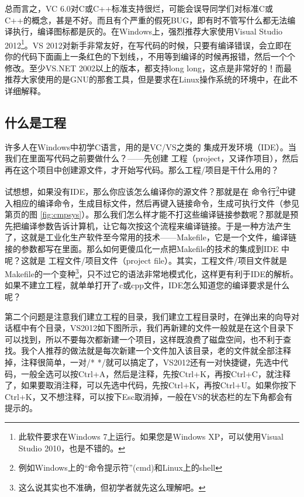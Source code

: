 \documentclass[11pt,twoside,a4paper,titlepage]{article}	%
\newcommand{\kw}[1]{\textcolor[rgb]{0.0,0.0,0.63}{ #1}}
\begin{document}
总而言之，VC 6.0对C或C++标准支持很烂，可能会误导同学们对标准C或C++的概念，甚是不好。而且有个严重的假死BUG，即有时不管写什么都无法编译执行，编译图标都是灰的。在Windows上，强烈推荐大家使用Visual Studio 2012\footnote{此软件要求在Windows 7上运行。如果您是Windows XP，可以使用Visual Studio 2010，也是不错的。}。VS 2012对新手非常友好，在写代码的时候，只要有编译错误，会立即在你的代码下面画上一条红色的下划线，{\color{red}{\uwave{\color{black}{就}}}}{\color{red}{\uwave{\color{black}{像}}}}{\color{red}{\uwave{\color{black}{这}}}}{\color{red}{\uwave{\color{black}{样}}}}，不用等到编译的时候再报错，然后一个个修改。至少VS.NET 2002以上的版本，都支持long long，这点是非常好的！而最推荐大家使用的是GNU的那套工具，但是要求在Linux操作系统的环境中，在此不详细解释。

\subsection{什么是工程}
许多人在Windows中初学C语言，用的是VC/VS之类的\kw{集成开发环境（IDE）}。当我们在里面写代码之前要做什么？——先创建\kw{工程（project，又译作项目）}，然后再在这个项目中创建源文件，才开始写代码。那么工程/项目是干什么用的？

试想想，如果没有IDE，那么你应该怎么编译你的源文件？那就是在\kw{命令行}\footnote{例如Windows上的“命令提示符”(cmd)和Linux上的shell}中键入相应的编译命令，生成目标文件，然后再键入链接命令，生成可执行文件（参见第\pageref{fig:cmpsys}页的图 \ref{fig:cmpsys}）。那么我们怎么样才能不打这些编译链接参数呢？那就是预先把编译参数告诉计算机，让它每次按这个流程来编译链接。于是一种方法产生了，这就是工业化生产软件至今常用的技术——Makefile，它是一个文件，编译链接的参数都写在里面。那么如何更傻瓜化一点把Makefile的技术的集成到IDE 中呢？这就是\kw{工程文件/项目文件（project file）}。其实，工程文件/项目文件就是Makefile的一个变种\footnote{这么说其实也不准确，但初学者就先这么理解吧。}，只不过它的语法非常地模式化，这样更有利于IDE的解析。如果不建立工程，就单单打开了c或cpp文件，IDE怎么知道您的编译要求是什么呢？

第二个问题是注意我们建立工程的目录，我们建立工程目录时，在弹出来的向导对话框中有个目录，VS2012如下图所示，我们再新建的文件一般就是在这个目录下可以找到，所以不要每次都新建一个项目，这样既浪费了磁盘空间，也不利于查找。我个人推荐的做法就是每次新建一个文件加入该目录，老的文件就全部注释掉，注释很简单，一对/* */就可以搞定了，VS2012还有一对快捷键，先选中代码，一般全选可以按Ctrl+A，然后是注释，先按Ctrl+K，再按Ctrl+C，就注释了，如果要取消注释，可以先选中代码，先按Ctrl+K，再按Ctrl+U。如果你按下Ctrl+K，又不想注释，可以按下Esc取消掉，一般在VS的状态栏的左下角都会有提示的。
\end{document}
